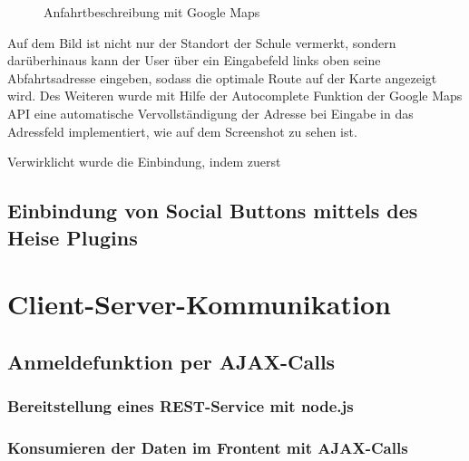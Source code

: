 \begin{figure}[!htbp]
	\caption{Anfahrtbeschreibung mit Google Maps}
	\label{fig:googleMaps}
\end{figure}

Auf dem Bild ist nicht nur der Standort der Schule vermerkt, sondern darüberhinaus kann der User über ein Eingabefeld links oben seine Abfahrtsadresse eingeben, sodass die optimale Route auf der Karte angezeigt wird. Des Weiteren wurde mit Hilfe der Autocomplete Funktion der Google Maps API eine automatische Vervollständigung der Adresse bei Eingabe in das Adressfeld implementiert, wie auf dem Screenshot zu sehen ist.
\par
Verwirklicht wurde die Einbindung, indem zuerst



\section{Einbindung von Social Buttons mittels des Heise Plugins}
\label{Einbindung von Social Buttons mittels des Heise Plugins}



\chapter{Client-Server-Kommunikation}
\label{Client-Server-Kommunikation}

\section{Anmeldefunktion per AJAX-Calls}
\label{Anmeldefunktion per AJAX-Calls}

\subsection{Bereitstellung eines REST-Service mit node.js}
\label{Bereitstellung eines REST-Service mit node.js}

\subsection{Konsumieren der Daten im Frontent mit AJAX-Calls}
\label{Konsumieren der Daten im Frontent mit AJAX-Calls}